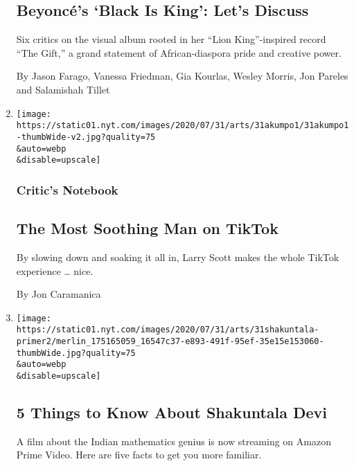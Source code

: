\begin{enumerate}
  \hypertarget{beyoncuxe9s-black-is-king-lets-discuss}{%
  \subsection{Beyoncé's `Black Is King': Let's
  Discuss}\label{beyoncuxe9s-black-is-king-lets-discuss}}

  Six critics on the visual album rooted in her ``Lion King''-inspired
  record ``The Gift,'' a grand statement of African-diaspora pride and
  creative power.

  By Jason Farago, Vanessa Friedman, Gia Kourlas, Wesley Morris, Jon
  Pareles and Salamishah Tillet
\item
  \href{/2020/07/31/arts/larry-scott-tiktok-larryakumpo.html}{}

  \texttt{[image: https://static01.nyt.com/images/2020/07/31/arts/31akumpo1/31akumpo1-thumbWide-v2.jpg?quality=75\\\&auto=webp\\\&disable=upscale]}

  \hypertarget{critics-notebook-2}{%
  \subsubsection{Critic's Notebook}\label{critics-notebook-2}}

  \hypertarget{the-most-soothing-man-on-tiktok}{%
  \subsection{The Most Soothing Man on
  TikTok}\label{the-most-soothing-man-on-tiktok}}

  By slowing down and soaking it all in, Larry Scott makes the whole
  TikTok experience \ldots{} nice.

  By Jon Caramanica
\item
  \href{/2020/07/31/movies/shakuntala-devi-movie.html}{}

  \texttt{[image: https://static01.nyt.com/images/2020/07/31/arts/31shakuntala-primer2/merlin\_175165059\_16547c37-e893-491f-95ef-35e15e153060-thumbWide.jpg?quality=75\\\&auto=webp\\\&disable=upscale]}

  \hypertarget{5-things-to-know-about-shakuntala-devi}{%
  \subsection{5 Things to Know About Shakuntala
  Devi}\label{5-things-to-know-about-shakuntala-devi}}

  A film about the Indian mathematics genius is now streaming on Amazon
  Prime Video. Here are five facts to get you more familiar.


\end{enumerate}
